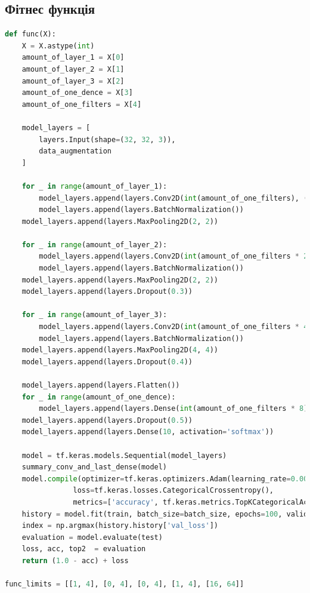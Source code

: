 \documentclass{article}
\begin{document}
        \subsection{Фітнес функція}
            \begin{lstlisting}[language=Python, caption=Fitness Func]
def func(X):
    X = X.astype(int)
    amount_of_layer_1 = X[0]
    amount_of_layer_2 = X[1]
    amount_of_layer_3 = X[2]
    amount_of_one_dence = X[3]
    amount_of_one_filters = X[4]

    model_layers = [
        layers.Input(shape=(32, 32, 3)),
        data_augmentation
    ]

    for _ in range(amount_of_layer_1):
        model_layers.append(layers.Conv2D(int(amount_of_one_filters), (3, 3), activation='relu', padding='same'))
        model_layers.append(layers.BatchNormalization())
    model_layers.append(layers.MaxPooling2D(2, 2))

    for _ in range(amount_of_layer_2):
        model_layers.append(layers.Conv2D(int(amount_of_one_filters * 2), (3, 3), activation='relu', padding='same'))
        model_layers.append(layers.BatchNormalization())
    model_layers.append(layers.MaxPooling2D(2, 2))
    model_layers.append(layers.Dropout(0.3))

    for _ in range(amount_of_layer_3):
        model_layers.append(layers.Conv2D(int(amount_of_one_filters * 4), (3, 3), activation='relu', padding='same'))
        model_layers.append(layers.BatchNormalization())
    model_layers.append(layers.MaxPooling2D(4, 4))
    model_layers.append(layers.Dropout(0.4))

    model_layers.append(layers.Flatten())
    for _ in range(amount_of_one_dence):
        model_layers.append(layers.Dense(int(amount_of_one_filters * 8), activation='relu'))
    model_layers.append(layers.Dropout(0.5))
    model_layers.append(layers.Dense(10, activation='softmax'))

    model = tf.keras.models.Sequential(model_layers)
    summary_conv_and_last_dense(model)
    model.compile(optimizer=tf.keras.optimizers.Adam(learning_rate=0.001),
                loss=tf.keras.losses.CategoricalCrossentropy(),
                metrics=['accuracy', tf.keras.metrics.TopKCategoricalAccuracy(k=2, name="Top2")])
    history = model.fit(train, batch_size=batch_size, epochs=100, validation_data=(val), callbacks=callbacks)
    index = np.argmax(history.history['val_loss'])
    evaluation = model.evaluate(test)
    loss, acc, top2  = evaluation
    return (1.0 - acc) + loss

func_limits = [[1, 4], [0, 4], [0, 4], [1, 4], [16, 64]]
            \end{lstlisting}
\end{document}
